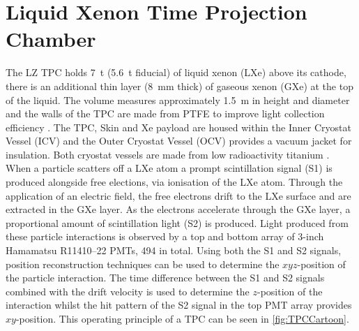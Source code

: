 \section{Liquid Xenon Time Projection Chamber}
The LZ TPC holds 7~t (5.6~t fiducial) of liquid xenon (LXe) above its cathode, there is an additional thin layer (8~mm thick) of gaseous xenon (GXe) at the top of the liquid. The volume measures approximately 1.5~m in height and diameter and the walls of the TPC are made from PTFE to improve light collection efficiency \cite{LZNIMA}. The TPC, Skin and Xe payload are housed within the Inner Cryostat Vessel (ICV) and the Outer Cryostat Vessel (OCV) provides a vacuum jacket for insulation. Both cryostat vessels are made from low radioactivity titanium \cite{LZ:2017iwn}. When a particle scatters off a LXe atom a prompt scintillation signal (S1) is produced alongside free elections, via ionisation of the LXe atom. Through the application of an electric field, the free electrons drift to the LXe surface and are extracted in the GXe layer. As the electrons accelerate through the GXe layer, a proportional amount of scintillation light (S2) is produced. Light produced from these particle interactions is observed by a top and bottom array of 3-inch Hamamatsu R11410–22 PMTs, 494 in total. Using both the S1 and S2 signals, position reconstruction techniques can be used to determine the $xyz$-position of the particle interaction. The time difference between the S1 and S2 signals combined with the drift velocity is used to determine the $z$-position of the interaction whilst the hit pattern of the S2 signal in the top PMT array provides $xy$-position. This operating principle of a TPC can be seen in \autoref{fig:TPCCartoon}.
